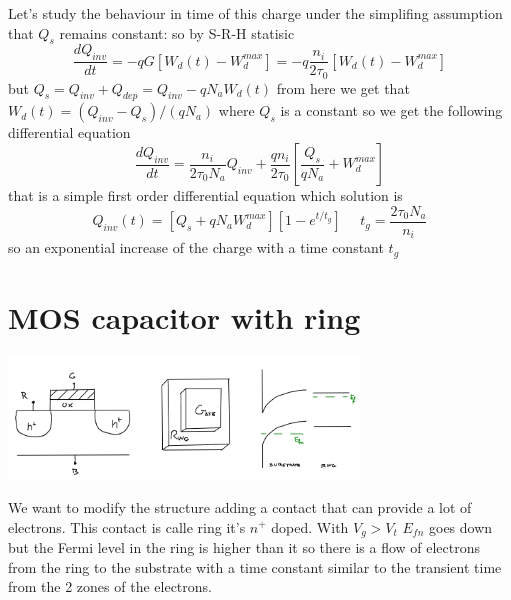 Let's study the behaviour in time of this charge under the simplifing assumption that $Q_s$ remains constant: so by S-R-H statisic 
\begin{equation}
\frac{dQ_{inv}}{dt}=-qG[W_d(t)-W_d^{max}]=-q \frac{n_i}{2\tau_0}[W_d(t)-W_d^{max}]
\end{equation}
but $Q_s=Q_{inv}+Q_{dep}=Q_{inv}-qN_aW_d(t)$ from here we get that $W_d(t)=(Q_{inv}-Q_s)/(qN_a)$ where $Q_s$ is a constant so we get the following differential equation
\begin{equation}
\frac{dQ_{inv}}{dt}=\frac{n_i}{2\tau_0N_a}Q_{inv}+\frac{qn_i}{2\tau_0}[\frac{Q_s}{qN_a}+W_d^{max}]
\end{equation}
that is a simple first order differential equation which solution is
\begin{equation}
Q_{inv}(t)=[Q_s+qN_aW_d^{max}][1-e^{t/t_g}] \ \ \ \ \ \ t_g=\frac{2\tau_0N_a}{n_i}
\end{equation}
so an exponential increase of the charge with a time constant $t_g$


\section{MOS capacitor with ring}
\centering
\includegraphics[width=0.7\textwidth]{ring.png}\\
\raggedright
We want to modify the structure adding a contact that can provide a lot of electrons. This contact is calle ring it's $n^+$ doped. With $V_g>V_t$ $E_{fn}$ goes down but the Fermi level in the ring is higher than it so there is a flow of electrons from the ring to the substrate with a time constant similar to the transient time from the 2 zones of the electrons.\\


